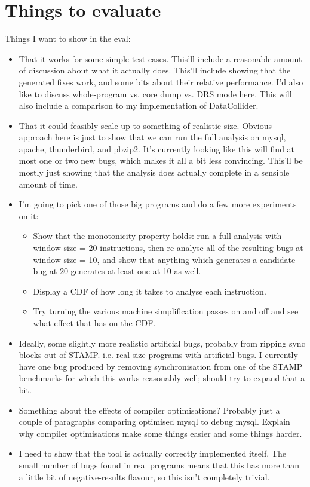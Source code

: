 \section{Things to evaluate}

Things I want to show in the eval:

\begin{itemize}
\item That it works for some simple test cases.  This'll include a
  reasonable amount of discussion about what it actually does.
  This'll include showing that the generated fixes work, and some bits
  about their relative performance.  I'd also like to discuss
  whole-program vs. core dump vs. DRS mode here.  This will also
  include a comparison to my implementation of DataCollider.
\item That it could feasibly scale up to something of realistic size.
  Obvious approach here is just to show that we can run the full
  analysis on mysql, apache, thunderbird, and pbzip2.  It's currently
  looking like this will find at most one or two new bugs, which makes
  it all a bit less convincing.  This'll be mostly just showing that
  the analysis does actually complete in a sensible amount of time.
\item I'm going to pick one of those big programs and do a few more
  experiments on it:

  \begin{itemize}
  \item Show that the monotonicity property holds: run a full analysis
    with window size = 20 instructions, then re-analyse all of the
    resulting bugs at window size = 10, and show that anything which
    generates a candidate bug at 20 generates at least one at 10 as
    well.
  \item Display a CDF of how long it takes to analyse each instruction.
  \item Try turning the various machine simplification passes on and off
    and see what effect that has on the CDF.
  \end{itemize}

\item Ideally, some slightly more realistic artificial bugs, probably
  from ripping sync blocks out of STAMP.  i.e. real-size programs with
  artificial bugs.  I currently have one bug produced by removing
  synchronisation from one of the STAMP benchmarks for which this
  works reasonably well; should try to expand that a bit.
\item Something about the effects of compiler optimisations?  Probably
  just a couple of paragraphs comparing optimised mysql to debug
  mysql.  Explain why compiler optimisations make some things easier
  and some things harder.
\item I need to show that the tool is actually correctly implemented
  itself.  The small number of bugs found in real programs means that
  this has more than a little bit of negative-results flavour, so this
  isn't completely trivial.
\end{itemize}

